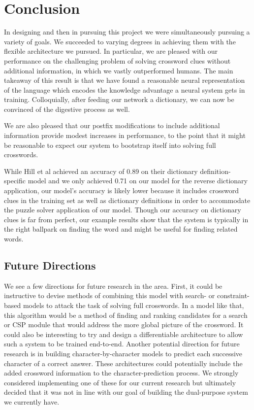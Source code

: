 \documentclass{article} %
\begin{document}
\section{Conclusion}
In designing and then in pursuing this project we were simultaneously pursuing a variety of goals. We succeeded to varying degrees in achieving them with the flexible architecture we pursued. In particular, we are pleased with our performance on the challenging problem of solving crossword clues without additional information, in which we vastly outperformed humans. The main takeaway of this result is that we have found a reasonable neural representation of the language which encodes the knowledge advantage a neural system gets in training. Colloquially, after feeding our network a dictionary, we can now be convinced of the digestive process as well.

We are also pleased that our postfix modifications to include additional information provide modest increases in performance, to the point that it might be reasonable to expect our system to bootstrap itself into solving full crosswords. 

While Hill et al achieved an accuracy of 0.89 on their dictionary definition-specific model and we only achieved 0.71 on our model for the reverse dictionary application, our model’s accuracy is likely lower because it includes crossword clues in the training set as well as dictionary definitions in order to accommodate the puzzle solver application of our model. Though our accuracy on dictionary clues is far from perfect, our example results show that the system is typically in the right ballpark on finding the word and might be useful for finding related words. 

\subsection{Future Directions}
We see a few directions for future research in the area. First, it could be instructive to devise methods of combining this model with search- or constraint-based models to attack the task of solving full crosswords. In a model like that, this algorithm would be a method of finding and ranking candidates for a search or CSP module that would address the more global picture of the crossword. It could also be interesting to try and design a differentiable architecture to allow such a system to be trained end-to-end.
Another potential direction for future research is in building character-by-character models to  predict each successive character of  a correct answer. These architectures could potentially include the added crossword information to the character-prediction process. We strongly considered implementing one of these for our current research but ultimately decided that it was not in line with our goal of building the dual-purpose system we currently have.
\end{document}
